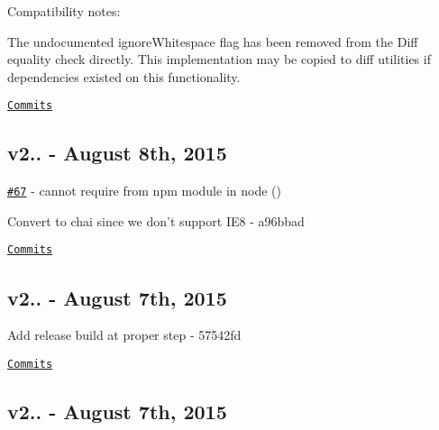 Compatibility notes\+:
\begin{DoxyItemize}
\item The undocumented ignore\+Whitespace flag has been removed from the Diff equality check directly. This implementation may be copied to diff utilities if dependencies existed on this functionality.
\end{DoxyItemize}

\href{https://github.com/kpdecker/jsdiff/compare/v2.0.2...v2.1.0}{\tt Commits}

\subsection*{v2.. -\/ August 8th, 2015}


\begin{DoxyItemize}
\item \href{https://github.com/kpdecker/jsdiff/issues/67}{\tt \#67} -\/ cannot require from npm module in node (\href{https://api.github.com/users/commenthol}{\tt })
\item Convert to chai since we don’t support I\+E8 -\/ a96bbad
\end{DoxyItemize}

\href{https://github.com/kpdecker/jsdiff/compare/v2.0.1...v2.0.2}{\tt Commits}

\subsection*{v2.. -\/ August 7th, 2015}


\begin{DoxyItemize}
\item Add release build at proper step -\/ 57542fd
\end{DoxyItemize}

\href{https://github.com/kpdecker/jsdiff/compare/v2.0.0...v2.0.1}{\tt Commits}

\subsection*{v2.. -\/ August 7th, 2015}


